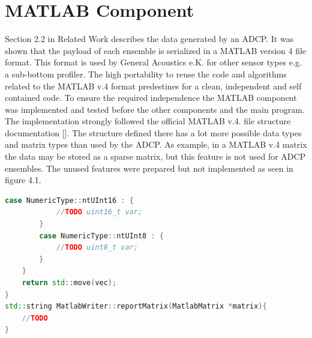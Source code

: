 \section{MATLAB Component}
Section 2.2 in Related Work describes the data generated by an ADCP. It was shown that the payload of each ensemble is serialized in a MATLAB version 4 file format. This format is used by General Acoustics e.K. for other sensor types e.g. a sub-bottom profiler. The high portability to reuse the code and algorithms related to the MATLAB v.4 format predestines for a clean, independent and self contained code. To ensure the required independence the MATLAB component was implemented and tested before the other components and the main program.\\
The implementation strongly followed the official MATLAB v.4. file structure documentation []. The structure defined there has a lot more possible data types and matrix types than used by the ADCP. As example, in a MATLAB v.4 matrix the data may be stored as a sparse matrix, but this feature is not used for ADCP ensembles. The unused features were prepared but not implemented as seen in figure 4.1.
\begin{lstlisting}[language=C++, caption=Code snippet of not implemented logic]
        case NumericType::ntUInt16 : {
            //TODO uint16_t var;
        }
        case NumericType::ntUInt8 : {
            //TODO uint8_t var;
        }
    }
    return std::move(vec);
}
std::string MatlabWriter::reportMatrix(MatlabMatrix *matrix){
    //TODO
}
\end{lstlisting}

